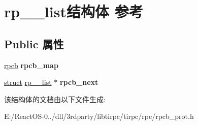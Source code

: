 \hypertarget{structrp____list}{}\section{rp\+\_\+\+\_\+list结构体 参考}
\label{structrp____list}
\subsection*{Public 属性}
\begin{DoxyCompactItemize}
\item 
\mbox{\label{structrp____list_a3739bd3c2dc30d16515fd5ae6799fe7b}} 
\hyperlink{structrpcb}{rpcb} {\bfseries rpcb\+\_\+map}
\item 
\mbox{\label{structrp____list_ae85c90e86dbedb952048f0d37c22b0c4}} 
\hyperlink{interfacestruct}{struct} \hyperlink{structrp____list}{rp\+\_\+\+\_\+list} $\ast$ {\bfseries rpcb\+\_\+next}
\end{DoxyCompactItemize}


该结构体的文档由以下文件生成\+:\begin{DoxyCompactItemize}
\item 
E\+:/\+React\+O\+S-\/0../dll/3rdparty/libtirpc/tirpc/rpc/rpcb\+\_\+prot.\+h\end{DoxyCompactItemize}

